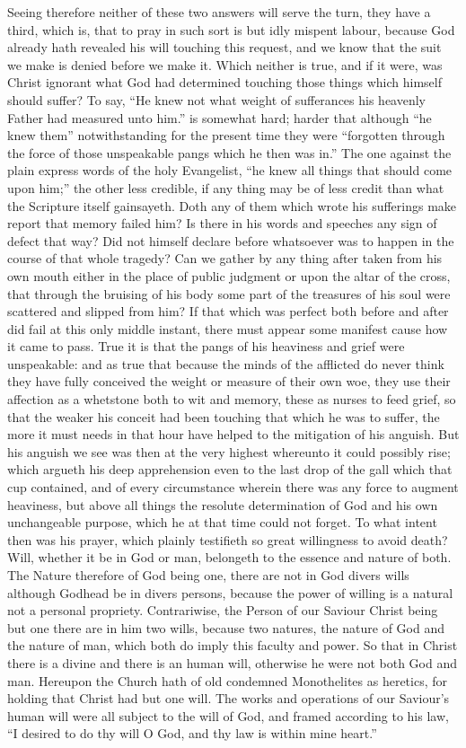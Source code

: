 Seeing therefore neither of these two answers will serve the turn, they have a third, which is, that to pray in such sort is but idly mispent labour, because God already hath revealed his will touching this request, and we know that the suit we make is denied before we make it. Which neither is true, and if it were, was Christ ignorant what God had determined touching those things which himself should suffer? To say, “He knew not what weight of sufferances his heavenly Father had measured unto him.” is somewhat hard; harder that although “he knew them” notwithstanding for the present time they were “forgotten through the force of those unspeakable pangs which he then was in.” The one against the plain express words of the holy Evangelist, “he knew all things that should come upon him;” the other less credible, if any thing may be of less credit than what the Scripture itself gainsayeth. Doth any of them which wrote his sufferings make report that memory failed him? Is there in his words and speeches any sign of defect that way? Did not himself declare before whatsoever was to happen in the  course of that whole tragedy? Can we gather by any thing after taken from his own mouth either in the place of public judgment or upon the altar of the cross, that through the bruising of his body some part of the treasures of his soul were scattered and slipped from him? If that which was perfect both before and after did fail at this only middle instant, there must appear some manifest cause how it came to pass. True it is that the pangs of his heaviness and grief were unspeakable: and as true that because the minds of the afflicted do never think they have fully conceived the weight or measure of their own woe, they use their affection as a whetstone both to wit and memory, these as nurses to feed grief, so that the weaker his conceit had been touching that which he was to suffer, the more it must needs in that hour have helped to the mitigation of his anguish. But his anguish we see was then at the very highest whereunto it could possibly rise; which argueth his deep apprehension even to the last drop of the gall which that cup contained, and of every circumstance wherein there was any force to augment heaviness, but above all things the resolute determination of God and his own unchangeable purpose, which he at that time could not forget.
To what intent then was his prayer, which plainly testifieth so great willingness to avoid death? Will, whether it be in God or man, belongeth to the essence and nature of both. The Nature therefore of God being one, there are not in God divers wills although Godhead be in divers persons, because the power of willing is a natural not a personal propriety. Contrariwise, the Person of our Saviour Christ being but one there are in him two wills, because two natures, the nature of God and the nature of man, which both do imply this faculty and power. So that in Christ there is a divine and there is an human will, otherwise he were not both God and man. Hereupon the Church hath of old condemned Monothelites as heretics, for holding that Christ had but one will. The works and operations of our Saviour’s human will were all subject to the will of God, and framed according to his law, “I desired to do thy will O God, and thy law is within mine heart.”

